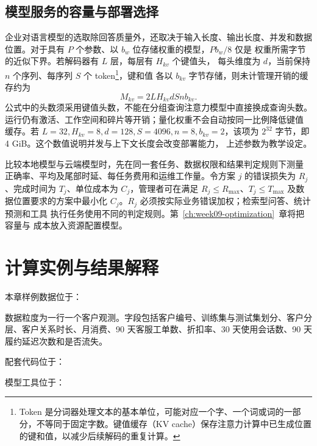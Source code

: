 \subsection{模型服务的容量与部署选择}
企业对语言模型的选取除回答质量外，还取决于输入长度、输出长度、并发和数据
位置。对于具有 \(P\) 个参数、以 \(b_w\) 位存储权重的模型，\(Pb_w/8\) 仅是
权重所需字节的近似下界。若解码器有 \(L\) 层，每层有 \(H_{kv}\) 个键值头，
每头维度为 \(d\)，当前保持 \(n\) 个序列、每序列 \(S\) 个 token\footnote{Token 是分词器处理文本的基本单位，可能对应一个字、一个词或词的一部分，不等同于固定字数。键值缓存（KV cache）保存注意力计算中已生成位置的键和值，以减少后续解码的重复计算。}，键和值
各以 \(b_{kv}\) 字节存储，则未计管理开销的缓存约为
\[
  M_{kv}=2LH_{kv}dSnb_{kv}.
\]
公式中的头数须采用键值头数，不能在分组查询注意力模型中直接换成查询头数。
运行仍有激活、工作空间和碎片等开销；量化权重不会自动按同一比例降低键值
缓存。若 \(L=32,H_{kv}=8,d=128,S=4096,n=8,b_{kv}=2\)，该项为
\(2^{32}\) 字节，即4 GiB。这个数值说明并发与上下文长度会改变部署能力，
上述参数为教学设定\cite{aiinfra2026}。

比较本地模型与云端模型时，先在同一套任务、数据权限和结果判定规则下测量
正确率、平均及尾部时延、每任务费用和运维工作量。令方案 \(j\) 的错误损失为
\(R_j\)、完成时间为 \(T_j\)、单位成本为 \(C_j\)，管理者可在满足
\(R_j\le R_{\max}\)、\(T_j\le T_{\max}\) 及数据位置要求的方案中最小化
\(C_j\)。\(R_j\) 必须按实际业务错误加权；检索型问答、统计预测和工具
执行任务使用不同的判定规则。第~\ref{ch:week09-optimization}~章将把容量与
成本放入资源配置模型。

\section{计算实例与结果解释}

本章样例数据位于：
\begin{center}
\end{center}
数据粒度为一行一个客户观测。字段包括客户编号、训练集与测试集划分、客户分层、客户关系时长、月消费、90 天客服工单数、折扣率、30 天使用会话数、90 天履约延迟次数和是否流失。

配套代码位于：
\begin{center}
\end{center}
模型工具位于：
\begin{center}
\qquad
{}
\end{center}

